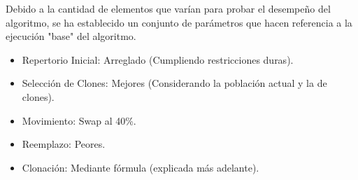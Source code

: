
Debido a la cantidad de elementos que varían para probar el desempeño
del algoritmo, se ha establecido un conjunto de parámetros que hacen
referencia a la ejecución "base" del algoritmo.
\begin{itemize}
	\item Repertorio Inicial: Arreglado (Cumpliendo restricciones duras).
	\item Selección de Clones: Mejores (Considerando la población actual y la de clones).
	\item Movimiento: Swap al 40\%.
	\item Reemplazo: Peores.
	\item Clonación: Mediante fórmula (explicada más adelante).
\end{itemize}

